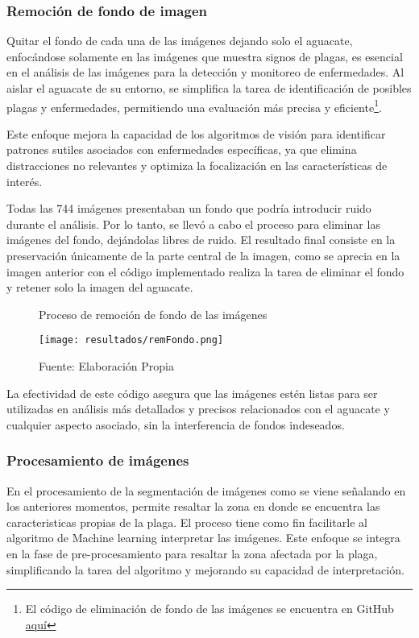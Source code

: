 \subsubsection{Remoción de fondo de imagen}

Quitar el fondo de cada una de las imágenes dejando solo el aguacate, enfocándose solamente en las imágenes que muestra signos de plagas, es esencial en el análisis de las imágenes para la detección y monitoreo de enfermedades. Al aislar el aguacate de su entorno, se simplifica la tarea de identificación de posibles plagas y enfermedades, permitiendo una evaluación más precisa y eficiente\footnote{El código de eliminación de fondo de las imágenes se encuentra en GitHub \href{https://github.com/juferoto/mlops_project/blob/master/notebooks/removerFondo.ipynb}{aquí}}.

\newpage

Este enfoque mejora la capacidad de los algoritmos de visión para identificar patrones sutiles asociados con enfermedades específicas, ya que elimina distracciones no relevantes y optimiza la focalización en las características de interés.

Todas las 744 imágenes presentaban un fondo que podría introducir ruido durante el análisis. Por lo tanto, se llevó a cabo el proceso para eliminar las imágenes del fondo, dejándolas libres de ruido. El resultado final consiste en la preservación únicamente de la parte central de la imagen, como se aprecia en la imagen anterior con el código implementado realiza la tarea de eliminar el fondo y retener solo la imagen del aguacate.

\begin{figure}[h]
\centering
\caption{Proceso de remoción de fondo de las imágenes}
\texttt{[image: resultados/remFondo.png]}
\caption*{\footnotesize Fuente: Elaboración Propia}
\label{fig:figuraRemFondo}
\end{figure} 

La efectividad de este código asegura que las imágenes estén listas para ser utilizadas en análisis más detallados y precisos relacionados con el aguacate y cualquier aspecto asociado, sin la interferencia de fondos indeseados.

\subsubsection{Procesamiento de imágenes}

En el procesamiento de la segmentación de imágenes como se viene señalando en los anteriores momentos, permite resaltar la zona en donde se encuentra las caracteristicas propias de la plaga. El proceso tiene como fin facilitarle al algoritmo de Machine learning interpretar las imágenes. Este enfoque se integra en la fase de pre-procesamiento para resaltar la zona afectada por la plaga, simplificando la tarea del algoritmo y mejorando su capacidad de interpretación.

